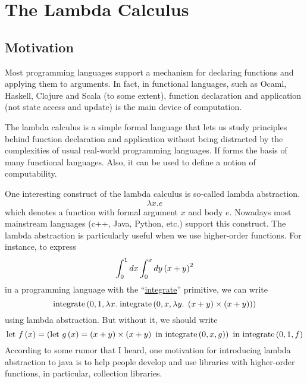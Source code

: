 \chapter{The Lambda Calculus} \label{ch:lambda-calculus}

\section{Motivation}

\begin{enumcirc}
	\item
	Most programming languages support a mechanism for declaring functions and
	applying them to arguments.
	In fact, in functional languages, such as Ocaml, Haskell, Clojure and Scala (to
	some extent),
	function declaration and application (not state access and update) is the main
	device of computation.
	\item
	The lambda calculus is a simple formal language that lets us study principles
	behind function declaration and application without being distracted by the
	complexities of usual real-world programming languages.
	If forms the basis of many functional languages.
	Also, it can be used to define a notion of computability.
	\item
	One interesting construct of the lambda calculus is so-called lambda
	abstraction.
	\[
		\lambda x. e
	\]
	which denotes a function with formal argument $x$ and body $e$.
	Nowadays most mainstream languages (c++, Java, Python, etc.) support this
	construct.
	The lambda abstraction is particularly useful when we use higher-order
	functions.
	For instance, to express
	\[
		\int_{0}^{1} dx \int_{0}^{x} dy \left( x+y \right)^2
	\]
	in a programming language with the ``\ul{integrate}'' primitive, we can write
	\[
		\textrm{integrate}
		\left( 
			0,
			1,
			\lambda x.\;
			\textrm{integrate}
			\left( 0, x, \lambda y.\; \left( x+y \right) \times \left( x+y \right) \right)
		 \right)
	\]
	using lambda abstraction.
	But without it, we should write
	\[
		\textrm{let }
		f\left( x \right) =
		\left( 
			\textrm{let }
			g\left( x \right) = \left( x+y \right) \times \left( x+y \right) \textrm{ in }
			\textrm{integrate}\left( 0, x, g \right)
		 \right) \textrm{ in }
		\textrm{integrate}\left( 0, 1, f \right)
	\]
	According to some rumor that I heard, one motivation for introducing lambda
	abstraction to java is to help people develop and use libraries with
	higher-order functions, in particular, collection libraries.
\end{enumcirc}

